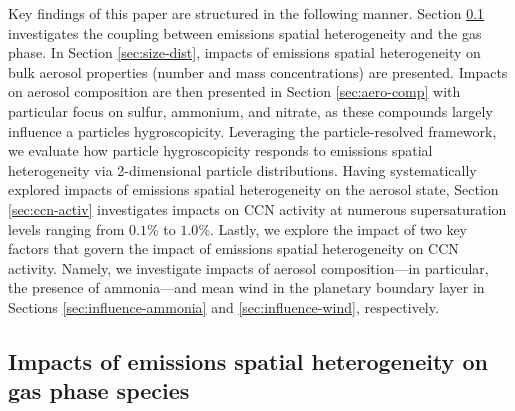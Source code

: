 \documentclass[journal abbreviation, manuscript]{copernicus}
\begin{document}
Key findings of this paper are structured in the following manner. Section \ref{sec:gas-impacts} investigates the coupling between emissions spatial heterogeneity and the gas phase. In Section \ref{sec:size-dist}, impacts of emissions spatial heterogeneity on bulk aerosol properties (number and mass concentrations) are presented. Impacts on aerosol composition are then presented in Section \ref{sec:aero-comp} with particular focus on sulfur, ammonium, and nitrate, as these compounds largely influence a particles hygroscopicity. Leveraging the particle-resolved framework, we evaluate how particle hygroscopicity responds to emissions spatial heterogeneity via 2-dimensional particle distributions. Having systematically explored impacts of emissions spatial heterogeneity on the aerosol state, Section \ref{sec:ccn-activ}  investigates impacts on CCN activity at numerous supersaturation levels ranging from $0.1\%$ to $1.0\%$. Lastly, we explore the impact of two key factors that govern the impact of emissions spatial heterogeneity on CCN activity. Namely, we investigate impacts of aerosol composition---in particular, the presence of ammonia---and mean wind in the planetary boundary layer in Sections \ref{sec:influence-ammonia} and \ref{sec:influence-wind}, respectively. 

\subsection{Impacts of emissions spatial heterogeneity on gas phase species}\label{sec:gas-impacts}
\end{document}
